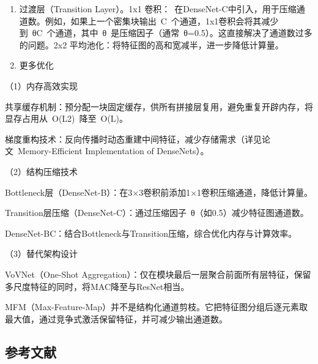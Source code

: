 \begin{enumerate}
\def\labelenumi{\arabic{enumi}.}
\item
  过渡层（Transition Layer）。1x1 卷积：~在DenseNet-C中引入，用于压缩通道数。例如，如果上一个密集块输出~C~个通道，1x1卷积会将其减少到~θC~个通道，其中~θ~是压缩因子（通常~θ=0.5）。这直接解决了通道数过多的问题。2x2 平均池化：将特征图的高和宽减半，进一步降低计算量。
\item
  更多优化
\end{enumerate}

（1）内存高效实现\hspace{0pt}

共享缓存机制：预分配一块固定缓存，供所有拼接层复用，避免重复开辟内存，将显存占用从~O(L2)~降至~O(L)。

梯度重构技术：反向传播时动态重建中间特征，减少存储需求（详见论文~Memory-Efficient Implementation of DenseNets）。

（2）结构压缩技术\hspace{0pt}

Bottleneck层（DenseNet-B）：在3×3卷积前添加1×1卷积压缩通道，降低计算量。

Transition层压缩（DenseNet-C）：通过压缩因子~θ（如0.5）减少特征图通道数。

DenseNet-BC：结合Bottleneck与Transition压缩，综合优化内存与计算效率。

（3）替代架构设计\hspace{0pt}

VoVNet（One-Shot Aggregation）：仅在模块最后一层聚合前面所有层特征，保留多尺度特征的同时，将MAC降至与ResNet相当。

MFM（Max-Feature-Map）并不是结构化通道剪枝。它把特征图分组后逐元素取最大值，通过竞争式激活保留特征，并可减少输出通道数。

\hypertarget{ux53c2ux8003ux6587ux732e-15}{%
\subsection{参考文献}\label{ux53c2ux8003ux6587ux732e-15}}

